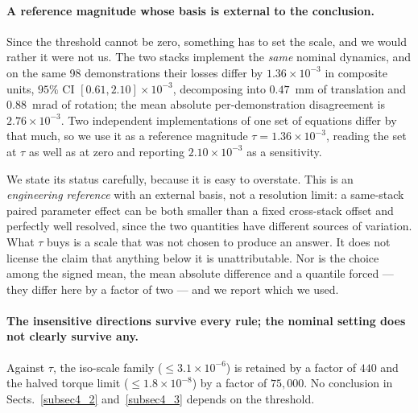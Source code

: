 \documentclass[pdflatex,iicol,sn-apa]{sn-jnl}
\theoremstyle{remark}
\begin{document}
\paragraph{A reference magnitude whose basis is external to the conclusion.}
Since the threshold cannot be zero, something has to set the scale, and we would rather it were not
us. The two stacks implement the \emph{same} nominal dynamics, and on the same 98 demonstrations
their losses differ by $1.36\times10^{-3}$ in composite units, $95\%$ CI
$[0.61, 2.10]\times10^{-3}$, decomposing into $0.47$~mm of translation and $0.88$~mrad of rotation;
the mean absolute per-demonstration disagreement is $2.76\times10^{-3}$. Two independent
implementations of one set of equations differ by that much, so we use it as a reference magnitude
$\tau = 1.36\times10^{-3}$, reading the set at $\tau$ as well as at zero and reporting
$2.10\times10^{-3}$ as a sensitivity.

We state its status carefully, because it is easy to overstate. This is an
\emph{engineering reference} with an external basis, not a resolution limit: a same-stack paired
parameter effect can be both smaller than a fixed cross-stack offset and perfectly well resolved,
since the two quantities have different sources of variation. What $\tau$ buys is a scale that was
not chosen to produce an answer. It does not license the claim that anything below it is
unattributable. Nor is the choice among the signed mean, the mean absolute difference and a quantile
forced --- they differ here by a factor of two --- and we report which we used.

\paragraph{The insensitive directions survive every rule; the nominal setting does not clearly
survive any.}
Against $\tau$, the iso-scale family ($\le 3.1\times10^{-6}$) is retained by a factor of $440$ and
the halved torque limit ($\le 1.8\times10^{-8}$) by a factor of $75{,}000$. No conclusion in
Sects.~\ref{subsec4_2} and~\ref{subsec4_3} depends on the threshold.
\end{document}
